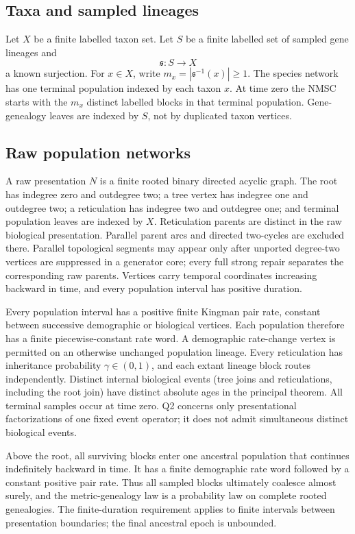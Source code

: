 \documentclass[11pt]{article}
\begin{document}
\subsection{Taxa and sampled lineages}
Let $X$ be a finite labelled taxon set.  Let $S$ be a finite labelled set of sampled gene lineages and
\[
 \mathfrak s:S\longrightarrow X
\]
a known surjection.  For $x\in X$, write $m_x=|\mathfrak s^{-1}(x)|\ge1$.  The species network has one terminal population indexed by each taxon $x$.  At time zero the NMSC starts with the $m_x$ distinct labelled blocks in that terminal population.  Gene-genealogy leaves are indexed by $S$, not by duplicated taxon vertices.

\subsection{Raw population networks}
A raw presentation $N$ is a finite rooted binary directed acyclic graph.  The root has indegree zero and outdegree two; a tree vertex has indegree one and outdegree two; a reticulation has indegree two and outdegree one; and terminal population leaves are indexed by $X$.  Reticulation parents are distinct in the raw biological presentation.  Parallel parent arcs and directed two-cycles are excluded there.  Parallel topological segments may appear only after unported degree-two vertices are suppressed in a generator core; every full strong repair separates the corresponding raw parents.  Vertices carry temporal coordinates increasing backward in time, and every population interval has positive duration.

Every population interval has a positive finite Kingman pair rate, constant between successive demographic or biological vertices. Each population therefore has a finite piecewise-constant rate word. A demographic rate-change vertex is permitted on an otherwise unchanged population lineage. Every reticulation has inheritance probability $\gamma\in(0,1)$, and each extant lineage block routes independently. Distinct internal biological events (tree joins and reticulations, including the root join) have distinct absolute ages in the principal theorem. All terminal samples occur at time zero. Q2 concerns only presentational factorizations of one fixed event operator; it does not admit simultaneous distinct biological events.

Above the root, all surviving blocks enter one ancestral population that continues indefinitely backward in time.  It has a finite demographic rate word followed by a constant positive pair rate.  Thus all sampled blocks ultimately coalesce almost surely, and the metric-genealogy law is a probability law on complete rooted genealogies.  The finite-duration requirement applies to finite intervals between presentation boundaries; the final ancestral epoch is unbounded.
\end{document}
